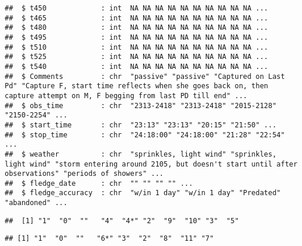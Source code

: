 \documentclass[
]{article}
\newenvironment{Shaded}{\begin{snugshade}}{\end{snugshade}}
\newcommand{\CommentTok}[1]{\textcolor[rgb]{0.56,0.35,0.01}{\textit{#1}}}
\newcommand{\FunctionTok}[1]{\textcolor[rgb]{0.00,0.00,0.00}{#1}}
\newcommand{\NormalTok}[1]{#1}
\newcommand{\SpecialCharTok}[1]{\textcolor[rgb]{0.00,0.00,0.00}{#1}}
\begin{document}
\begin{verbatim}
##  $ t450             : int  NA NA NA NA NA NA NA NA NA NA ...
##  $ t465             : int  NA NA NA NA NA NA NA NA NA NA ...
##  $ t480             : int  NA NA NA NA NA NA NA NA NA NA ...
##  $ t495             : int  NA NA NA NA NA NA NA NA NA NA ...
##  $ t510             : int  NA NA NA NA NA NA NA NA NA NA ...
##  $ t525             : int  NA NA NA NA NA NA NA NA NA NA ...
##  $ t540             : int  NA NA NA NA NA NA NA NA NA NA ...
##  $ Comments         : chr  "passive" "passive" "Captured on Last Pd" "Capture F, start time reflects when she goes back on, then capture attempt on M, F begging from last PD till end" ...
##  $ obs_time         : chr  "2313-2418" "2313-2418" "2015-2128" "2150-2254" ...
##  $ start_time       : chr  "23:13" "23:13" "20:15" "21:50" ...
##  $ stop_time        : chr  "24:18:00" "24:18:00" "21:28" "22:54" ...
##  $ weather          : chr  "sprinkles, light wind" "sprinkles, light wind" "storm entering around 2105, but doesn't start until after observations" "periods of showers" ...
##  $ fledge_date      : chr  "" "" "" "" ...
##  $ fledge_accuracy  : chr  "w/in 1 day" "w/in 1 day" "Predated" "abandoned" ...
\end{verbatim}

\begin{Shaded}
\end{Shaded}

\begin{verbatim}
##  [1] "1"  "0"  ""   "4"  "4*" "2"  "9"  "10" "3"  "5"
\end{verbatim}

\begin{Shaded}
\end{Shaded}

\begin{verbatim}
## [1] "1"  "0"  ""   "6*" "3"  "2"  "8"  "11" "7"
\end{verbatim}

\begin{Shaded}
\end{Shaded}
\end{document}
